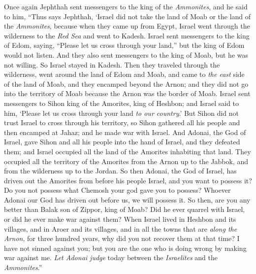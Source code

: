 \begin{biblechapter}
\verse Once again Jephthah sent messengers to the king of the \textit{Ammonites},
\verse and he said to him, “Thus says Jephthah, ‘Israel did not take the land of Moab or the land of the \textit{Ammonites},
\verse because when they came up from Egypt, Israel went through the wilderness to the \textit{Red Sea} and went to Kadesh.
\verse Israel sent messengers to the king of Edom, saying, “Please let us cross through your land,” but the king of Edom would not listen. And they also sent messengers to the king of Moab, but he was not willing. So Israel stayed in Kadesh.
\verse Then they traveled through the wilderness, went around the land of Edom and Moab, and came to \textit{the east} side of the land of Moab, and they encamped beyond the Arnon; and they did not go into the territory of Moab because the Arnon was the border of Moab.
\verse Israel sent messengers to Sihon king of the Amorites, king of Heshbon; and Israel said to him, ‘Please let us cross through your land \textit{to our country}.’
\verse But Sihon did not trust Israel to cross through his territory, so Sihon gathered all his people and then encamped at Jahaz; and he made war with Israel.
\verse And Adonai, the God of Israel, gave Sihon and all his people into the hand of Israel, and they defeated them; and Israel occupied all the land of the Amorites inhabiting that land.
\verse They occupied all the territory of the Amorites from the Arnon up to the Jabbok, and from the wilderness up to the Jordan.
\verse So then Adonai, the God of Israel, has driven out the Amorites from before his people Israel, and you want to possess it?
\verse Do you not possess what Chemosh your god gave you to possess? Whoever Adonai our God has driven out before us, we will possess it.
\verse So then, are you any better than Balak son of Zippor, king of Moab? Did he ever quarrel with Israel, or did he ever make war against them?
\verse When Israel lived in Heshbon and its villages, and in Aroer and its villages, and in all the towns that are \textit{along the Arnon}, for three hundred years, why did you not recover them at that time?
\verse I have not sinned against you; but you are the one who is doing wrong by making war against me. \textit{Let Adonai judge} today between the \textit{Israelites} and the \textit{Ammonites}.”

\end{biblechapter}
